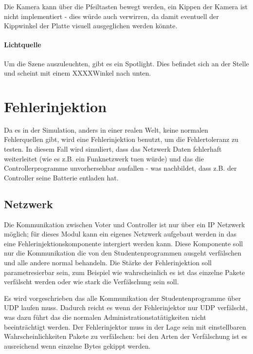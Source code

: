 Die Kamera kann {\"{u}}ber die Pfeiltasten bewegt werden, ein Kippen der Kamera ist nicht implementiert - dies w{\"{u}}rde auch verwirren, da damit eventuell der Kippwinkel der
Platte visuell ausgeglichen werden k{\"{o}}nnte.

\paragraph{Lichtquelle} Um die Szene auszuleuchten, gibt es ein Spotlight. Dies befindet sich an der Stelle  und scheint mit einem XXXX\textdegree Winkel nach unten.


\clearpage
\section{Fehlerinjektion}
Da es in der Simulation, anders in einer realen Welt, keine normalen Fehlerquellen gibt, wird eine Fehlerinjektion benutzt, um die Fehlertoleranz zu testen.
In diesem Fall wird simuliert, dass das Netzwerk Daten fehlerhaft weiterleitet (wie es z.B. ein Funknetzwerk tuen w{\"{u}}rde) und das die Controllerprogramme
unvorhersehbar ausfallen - was nachbildet, dass z.B. der Controller seine Batterie entladen hat.


\subsection{Netzwerk}
Die Kommunikation zwischen Voter und Controller ist nur {\"{u}}ber ein IP Netzwerk m{\"{o}}glich; f{\"{u}}r dieses Modul kann ein eigenes Netzwerk aufgebaut werden in das eine
Fehlerinjektionskomponente intergiert werden kann. Diese Komponente soll nur die Kommunikation die von den Studentenprogrammen ausgeht verf{\"{a}}lschen und alle andere normal
behandeln. Die St{\"{a}}rke der Fehlerinjektion soll parametresierbar sein, zum Beispiel wie wahrscheinlich es ist das einzelne Pakete verf{\"{a}}lscht werden oder wie stark
die Verf{\"{a}}lschung sein soll.

Es wird vorgeschrieben das alle Kommunikation der Studentenprogramme {\"{u}}ber UDP laufen muss. Dadurch reicht es wenn der Fehlerinjektor nur UDP verf{\"{a}}lscht, was dazu
f{\"{u}}hrt das die normalen Administrationstat{\"{a}}tigkeiten nicht beeintr{\"{a}}chtigt werden. Der Fehlerinjektor muss in der Lage sein mit einstellbaren Wahrscheinlichkeiten
Pakete zu verf{\"{a}}lschen: bei den Arten der Verf{\"{a}}lschung ist es ausreichend wenn einzelne Bytes gekippt werden.

